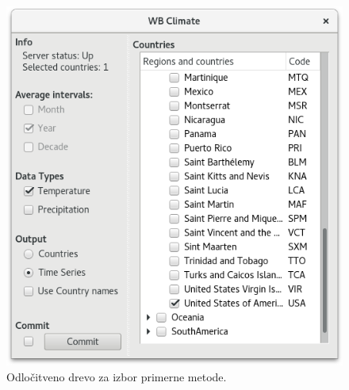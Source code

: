 \begin{figure}
\begin{center}
\includegraphics[width=12cm]{pic/co2_temp_climate_selection.png}
\end{center}
\caption{Odločitveno drevo za izbor primerne metode.}
\label{co2_temp_indicator}
\end{figure} 

